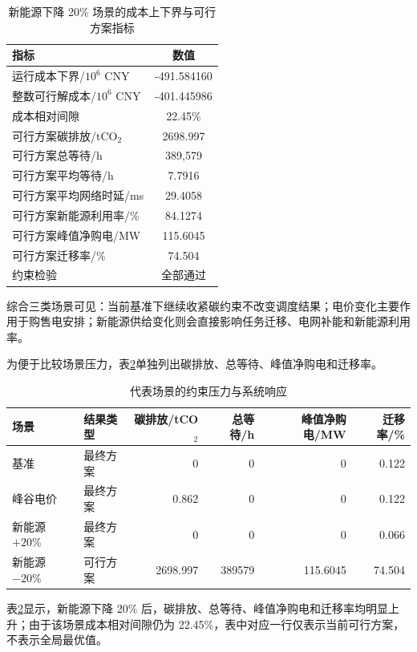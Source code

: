 \begingroup
{}
\begin{table}[!htbp]
\centering
\caption{新能源下降 20\% 场景的成本上下界与可行方案指标}
\label{tab:q4-renew-down-bounded}
\begingroup
\setlength{\tabcolsep}{30pt}
\begin{tabular}{lc}
\toprule
\rowcolor{CumcmLightBlue}
指标 & 数值 \\
\midrule
运行成本下界/$10^6$ CNY & -491.584160 \\
整数可行解成本/$10^6$ CNY & -401.445986 \\
成本相对间隙 & 22.45\% \\
可行方案碳排放/tCO$_2$ & 2698.997 \\
可行方案总等待/h & 389,579 \\
可行方案平均等待/h & 7.7916 \\
可行方案平均网络时延/ms & 29.4058 \\
可行方案新能源利用率/\% & 84.1274 \\
可行方案峰值净购电/MW & 115.6045 \\
可行方案迁移率/\% & 74.504 \\
约束检验 & 全部通过 \\
\bottomrule
\end{tabular}
\endgroup
\end{table}
\endgroup
\FloatBarrier

综合三类场景可见：当前基准下继续收紧碳约束不改变调度结果；电价变化主要作用于购售电安排；新能源供给变化则会直接影响任务迁移、电网补能和新能源利用率。

为便于比较场景压力，表\ref{tab:q4-constraint-pressure}单独列出碳排放、总等待、峰值净购电和迁移率。

\begin{table}[H]
\centering
\caption{代表场景的约束压力与系统响应}
\label{tab:q4-constraint-pressure}
\small
\begin{tabular}{llrrrr}
\toprule
\rowcolor{CumcmLightBlue}
场景 & 结果类型 & 碳排放/tCO$_2$ & 总等待/h & 峰值净购电/MW & 迁移率/\% \\
\midrule
基准 & 最终方案 & 0 & 0 & 0 & 0.122 \\
峰谷电价 & 最终方案 & 0.862 & 0 & 0 & 0.122 \\
新能源 $+20\%$ & 最终方案 & 0 & 0 & 0 & 0.066 \\
新能源 $-20\%$ & 可行方案 & 2698.997 & 389579 & 115.6045 & 74.504 \\
\bottomrule
\end{tabular}
\end{table}

表\ref{tab:q4-constraint-pressure}显示，新能源下降 20\% 后，碳排放、总等待、峰值净购电和迁移率均明显上升；由于该场景成本相对间隙仍为 22.45\%，表中对应一行仅表示当前可行方案，不表示全局最优值。